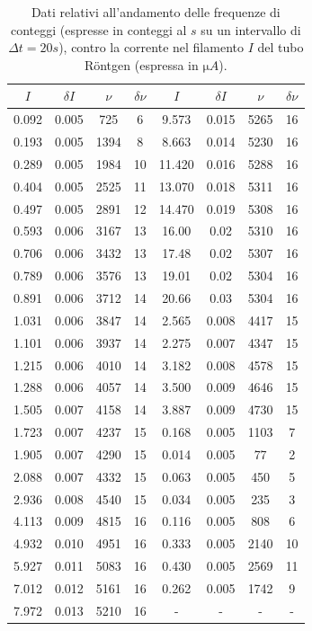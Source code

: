 \begin{table}
\centering \small
\begin{tabular}{cccc|cccc}
    $I $ & $\delta I $ & $\nu $ & $\delta \nu $ & $I $ & $\delta I $ & $\nu $ & $\delta \nu $ \\
    \hline
    0.092 & 0.005 & 725 & 6   & 9.573 & 0.015 & 5265 & 16 \\
    0.193 & 0.005 & 1394 & 8  & 8.663 & 0.014 & 5230 & 16 \\
    0.289 & 0.005 & 1984 & 10 & 11.420 & 0.016 & 5288 & 16 \\
    0.404 & 0.005 & 2525 & 11 & 13.070 & 0.018 & 5311 & 16 \\
    0.497 & 0.005 & 2891 & 12 & 14.470 & 0.019 & 5308 & 16 \\
    0.593 & 0.006 & 3167 & 13 & 16.00 & 0.02 & 5310 & 16 \\
    0.706 & 0.006 & 3432 & 13 & 17.48 & 0.02 & 5307 & 16 \\
    0.789 & 0.006 & 3576 & 13 & 19.01 & 0.02 & 5304 & 16 \\
    0.891 & 0.006 & 3712 & 14 & 20.66 & 0.03 & 5304 & 16 \\
    1.031 & 0.006 & 3847 & 14 & 2.565 & 0.008 & 4417 & 15 \\
    1.101 & 0.006 & 3937 & 14 & 2.275 & 0.007 & 4347 & 15 \\
    1.215 & 0.006 & 4010 & 14 & 3.182 & 0.008 & 4578 & 15 \\
    1.288 & 0.006 & 4057 & 14 & 3.500 & 0.009 & 4646 & 15 \\
    1.505 & 0.007 & 4158 & 14 & 3.887 & 0.009 & 4730 & 15 \\
    1.723 & 0.007 & 4237 & 15 & 0.168 & 0.005 & 1103 & 7 \\
    1.905 & 0.007 & 4290 & 15 & 0.014 & 0.005 & 77 & 2 \\
    2.088 & 0.007 & 4332 & 15 & 0.063 & 0.005 & 450 & 5 \\
    2.936 & 0.008 & 4540 & 15 & 0.034 & 0.005 & 235 & 3 \\
    4.113 & 0.009 & 4815 & 16 & 0.116 & 0.005 & 808 & 6 \\
    4.932 & 0.010 & 4951 & 16 & 0.333 & 0.005 & 2140 & 10 \\
    5.927 & 0.011 & 5083 & 16 & 0.430 & 0.005 & 2569 & 11 \\
    7.012 & 0.012 & 5161 & 16 & 0.262 & 0.005 & 1742 & 9 \\
    7.972 & 0.013 & 5210 & 16 & - & - & - & -
\end{tabular}
\caption{Dati relativi all'andamento delle frequenze di conteggi (espresse in conteggi al $ \unit{s} $ su un intervallo di $ \Delta t = 20 \unit{s} $), contro la corrente nel filamento $ I $ del tubo Röntgen (espressa in $ \unit{\micro A} $).}
\label{tab:Igeiger}
\end{table}

